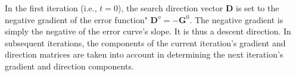 

In the first iteration (i.e., $t = 0$), the search direction vector $\textbf{D}$ is set to the negative gradient of the error function"
$\textbf{D}^{o} = - \textbf{G}^{0}$.  The negative gradient is simply the negative of the error curve's slope. It is thus  a descent direction.
In subsequent iterations, the components of the current iteration's gradient and direction matrices are taken into account in determining the next iteration's gradient and direction components.

 
